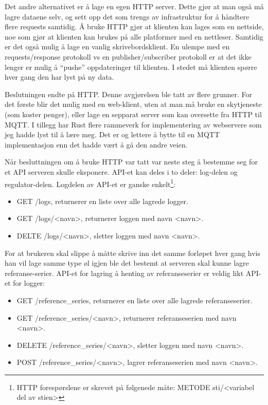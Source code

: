 Det andre alternativet er å lage en egen HTTP server. Dette gjør at man også må lagre dataene selv, og sett opp det som trengs av infrastruktur for å håndtere flere requests samtidig. Å bruke HTTP gjør at klienten kan lages som en nettside, noe som gjør at klienten kan brukes på alle platformer med en nettleser. Samtidig er det også mulig å lage en vanlig skrivebordsklient. En ulempe med en requests/response protokoll vs en publisher/subscriber protokoll er at det ikke lenger er mulig å ``pushe'' oppdateringer til klienten. I stedet må klienten spørre hver gang den har lyst på ny data.

Beslutningen endte på HTTP. Denne avgjørelsen ble tatt av flere grunner. For det første blir det mulig med en web-klient, uten at man må bruke en skytjeneste (som koster penger), eller lage en sepparat server som kan oversette fra HTTP til MQTT. I tillegg har Rust flere rammeverk for implementering av webservere som jeg hadde lyst til å lære meg. Det er og lettere å bytte til en MQTT implementasjon enn det hadde vært å gå den andre veien.

Når besluttningen om å bruke HTTP var tatt var neste steg å bestemme seg for et API serveren skulle eksponere. API-et kan deles i to deler: log-delen og regulator-delen.
Logdelen av API-et er ganske enkelt\footnote{HTTP forespørslene er skrevet på følgenede måte: METODE sti/<variabel del av stien>}:
\begin{itemize}
    \item GET /logs, returnerer en liste over alle lagrede logger.
    \item GET /logs/<navn>, returnerer loggen med navn <navn>.
    \item DELTE /logs/<navn>, sletter loggen med navn <navn>.
\end{itemize}

For at brukeren skal slippe å måtte skrive inn det samme forløpet hver gang hvis han vil lage samme type øl igjen ble det bestemt at serveren skal kunne lagre referanse-serier. API-et for lagring å henting av referanseserier er veldig likt API-et for logger:
\begin{itemize}
    \item GET /reference\_series, returnerer en liste over alle lagrede referanseserier.
    \item GET /reference\_series/<navn>, returnerer referanseserien med navn <navn>.
    \item DELETE /reference\_series/<navn>, sletter loggen med navn <navn>.
    \item POST /reference\_series/<navn>, lagrer referanseserien med navn <navn>.
\end{itemize}

